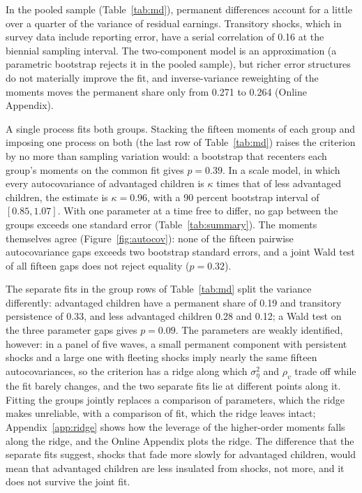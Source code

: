 \documentclass[11pt]{article}
\begin{document}
In the pooled sample (Table~\ref{tab:md}), permanent
differences account for a little over a quarter of the variance of residual earnings. Transitory shocks, which in survey data include reporting error, have a serial correlation of 0.16 at the biennial sampling interval. The two-component model is an approximation (a parametric bootstrap rejects it in the pooled sample), but richer error structures do not materially improve the fit, and inverse-variance reweighting of the moments moves the permanent share only from 0.271 to 0.264 (Online Appendix).

A single process fits both groups. Stacking the fifteen moments of each group and imposing one process on both (the last row of Table~\ref{tab:md}) raises the criterion by no more than sampling variation would: a bootstrap that recenters each group's moments on the common fit gives $p = 0.39$. In a scale model, in which every autocovariance of advantaged children is $\kappa$ times that of less advantaged children, the estimate is $\kappa = 0.96$, with a 90 percent bootstrap interval of $[0.85, 1.07]$. With one parameter at a time free to differ, no gap between the groups exceeds one standard error (Table~\ref{tab:summary}). The moments themselves agree (Figure~\ref{fig:autocov}): none of the fifteen pairwise autocovariance gaps exceeds two bootstrap standard errors, and a joint Wald test of all fifteen gaps does not reject equality ($p = 0.32$).

The separate fits in the group rows of Table~\ref{tab:md} split the variance differently: advantaged children have a permanent share of 0.19 and transitory persistence of 0.33, and less advantaged children 0.28 and 0.12; a Wald test on the three parameter gaps gives $p = 0.09$. The parameters are weakly identified, however: in a panel of five waves, a small permanent component with persistent shocks and a large one with fleeting shocks imply nearly the same fifteen autocovariances, so the criterion has a ridge along which $\sigma^2_\eta$ and $\rho_v$ trade off while the fit barely changes, and the two separate fits lie at different points along it. Fitting the groups jointly replaces a comparison of parameters, which the ridge makes unreliable, with a comparison of fit, which the ridge leaves intact; Appendix~\ref{app:ridge} shows how the leverage of the higher-order moments falls along the ridge, and the Online Appendix plots the ridge. The difference that the separate fits suggest, shocks that fade more slowly for advantaged children, would mean that advantaged children are less insulated from shocks, not more, and it does not survive the joint fit.
\end{document}
